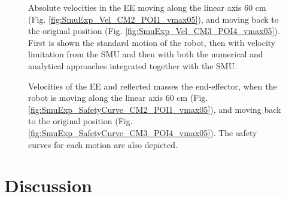\begin{figure}[htp!]
	\centering	
	 	 	
		\caption{Absolute velocities in the EE moving along the linear axis 60 cm (Fig. \ref{fig:SmuExp_Vel_CM2_POI1_vmax05}), and moving back to the original position (Fig. \ref{fig:SmuExp_Vel_CM3_POI4_vmax05}). First is shown the standard motion of the robot, then with velocity limitation from the SMU and then with both the numerical and analytical approaches integrated together with the SMU.}
	\label{fig:SmuExp_Vel_vmax05}
\end{figure}




\begin{figure}[htp!]
	\centering	
	 	 	
	\caption{Velocities of the EE and reflected masses the end-effector, when the robot is moving along the linear axis 60 cm (Fig. \ref{fig:SmuExp_SafetyCurve_CM2_POI1_vmax05}), and moving back to the original position (Fig. \ref{fig:SmuExp_SafetyCurve_CM3_POI4_vmax05}). The safety curves for each motion are also depicted.}  
	\label{fig:SmuExp_SafetyCurve_vmax05}
\end{figure}


\section{Discussion}



